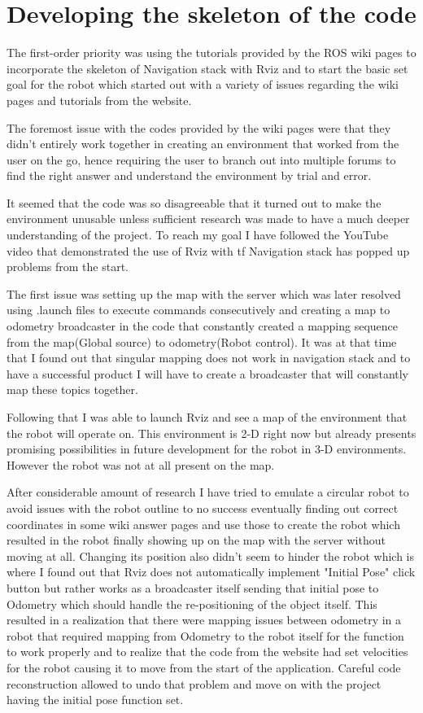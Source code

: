 \documentclass{report}
\begin{document}
    \section{Developing the skeleton of the code}
    The first-order priority was using the tutorials provided by the ROS wiki pages to\cite{navTuts} incorporate the skeleton of Navigation stack with Rviz and to start the basic set goal for the robot which started out with a variety of issues regarding the wiki pages and tutorials from the website.

    The foremost issue with the codes provided by the wiki pages were that they didn't entirely work together in creating an environment that worked from the user on the go\cite{Account}, hence requiring the user to branch out into multiple forums to find the right answer and understand the environment by trial and error.

    It seemed that the code was so disagreeable that it turned out to make the environment unusable unless sufficient research was made to have a much deeper understanding of the project. To reach my goal I have followed the YouTube video that demonstrated the use of Rviz with tf Navigation stack\cite{navTuts2}\cite{navRvizVid} has popped up problems from the start.

    The first issue was setting up the map with the server which was later resolved using .launch files to execute commands consecutively and creating a map to odometry broadcaster in the code that constantly created a mapping sequence from the map(Global source) to odometry(Robot control). It was at that time that I found out that singular mapping does not work in navigation stack and to have a successful product I will have to create a broadcaster that will constantly map these topics together.

    Following that I was able to launch Rviz and see a map of the environment that the robot will operate on. This environment is 2-D right now but already presents promising possibilities in future development for the robot in 3-D environments. However the robot was not at all present on the map.

    After considerable amount of research I have tried to emulate a circular robot to avoid issues with the robot outline to no success eventually finding out correct coordinates in some wiki answer pages\cite{footprint} and use those to create the robot which resulted in the robot finally showing up on the map with the server without moving at all. Changing its position also didn't seem to hinder the robot which is where I found out that Rviz does not automatically implement "Initial Pose" click button but rather works as a broadcaster itself sending that initial pose to Odometry which should handle the re-positioning of the object itself. This resulted in a realization that there were mapping issues between odometry in a robot that required mapping from Odometry to the robot itself for the function to work properly and to realize that the code from the website had set velocities for the robot causing it to move from the start of the application. Careful code reconstruction allowed to undo that problem and move on with the project having the initial pose function set.
\end{document}
